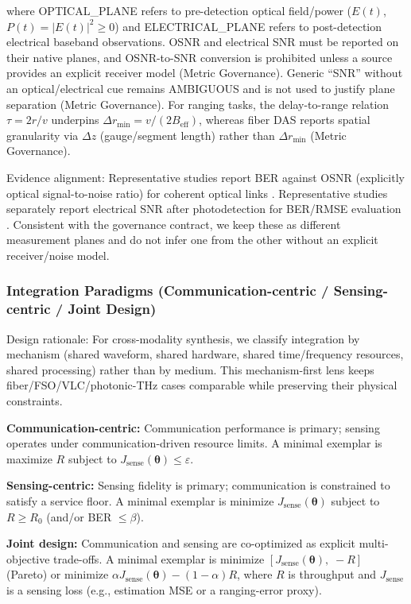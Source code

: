 \documentclass[lettersize,journal]{IEEEtran}
\begin{document}
where OPTICAL\_PLANE refers to pre-detection optical field/power (\(E(t)\), \(P(t)=|E(t)|^2\ge 0\)) and ELECTRICAL\_PLANE refers to post-detection electrical baseband observations. OSNR and electrical SNR must be reported on their native planes, and OSNR-to-SNR conversion is prohibited unless a source provides an explicit receiver model (Metric Governance). Generic ``SNR'' without an optical/electrical cue remains AMBIGUOUS and is not used to justify plane separation (Metric Governance). For ranging tasks, the delay-to-range relation \(\tau=2r/v\) underpins \(\Delta r_{\min}=v/(2B_{\text{eff}})\), whereas fiber DAS reports spatial granularity via \(\Delta z\) (gauge/segment length) rather than \(\Delta r_{\min}\) (Metric Governance).

Evidence alignment: Representative studies report BER against OSNR (explicitly optical signal-to-noise ratio) for coherent optical links \cite{O_ISAC_132,O_ISAC_076}.
Representative studies separately report electrical SNR after photodetection for BER/RMSE evaluation \cite{O_ISAC_061,O_ISAC_100,O_ISAC_023}. Consistent with the governance contract, we keep these as different measurement planes and do not infer one from the other without an explicit receiver/noise model.

\subsubsection{Integration Paradigms (Communication-centric / Sensing-centric / Joint Design)}
Design rationale: For cross-modality synthesis, we classify integration by mechanism (shared waveform, shared hardware, shared time/frequency resources, shared processing) rather than by medium. This mechanism-first lens keeps fiber/FSO/VLC/photonic-THz cases comparable while preserving their physical constraints.


\textbf{Communication-centric:} Communication performance is primary; sensing operates under communication-driven resource limits. A minimal exemplar is maximize \(R\) subject to \(J_{\text{sense}}(\boldsymbol{\theta})\le \varepsilon\).

\textbf{Sensing-centric:} Sensing fidelity is primary; communication is constrained to satisfy a service floor. A minimal exemplar is minimize \(J_{\text{sense}}(\boldsymbol{\theta})\) subject to \(R\ge R_0\) (and/or BER \(\le \beta\)).

\textbf{Joint design:} Communication and sensing are co-optimized as explicit multi-objective trade-offs. A minimal exemplar is minimize \([J_{\text{sense}}(\boldsymbol{\theta}),\; -R]\) (Pareto) or minimize \(\alpha J_{\text{sense}}(\boldsymbol{\theta})-(1-\alpha)R\), where \(R\) is throughput and \(J_{\text{sense}}\) is a sensing loss (e.g., estimation MSE or a ranging-error proxy).
\end{document}
